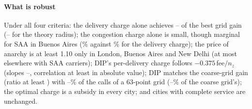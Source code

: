 \documentclass[preprint,12pt]{elsarticle}
\theoremstyle{definition}
\theoremstyle{remark}
\begin{document}
\begin{table}[tbp]\centering\small
\caption{Game results under four carrier criteria, three seeds, mean. PoA with the true expected routing cost and with the carriers' own (model) cost. DIP gain as \% of $|$social cost$|$ under each cost. Best uniform per-delivery charge on the coarse grid as a fraction of the fee. Weighted DIP charge: $u_z/$fee weighted by deliveries.}\label{tab:criterion}
\end{table}

\paragraph{What is robust} Under all four criteria: the delivery charge alone achieves \CritDelShareMin--\CritDelShareMax{} of the best grid gain (\CritDelShareMinTh--\CritDelShareMaxTh{} for the theory radius); the congestion charge alone is small, though marginal for SAA in Buenos Aires (\CritCongSaaBA\% against \CritDelSaaBA\% for the delivery charge); the price of anarchy is at least 1.10 only in London, Buenos Aires and New Delhi (at most \CritPoaAboveOther{} elsewhere with SAA carriers); DIP's per-delivery charge follows $-0.375\,$fee$/n_z$ (slopes \CritSlopeMin--\CritSlopeMax, correlation at least \CritCorrAbsMin{} in absolute value); DIP matches the coarse-grid gain (ratio at least \CritDipGridMin) with \CritDipCallsShareSixThreeMin--\CritDipCallsShareSixThreeMax\% of the calls of a 63-point grid (\CritDipCallsShareGridMin--\CritDipCallsShareGridMax\% of the coarse grid's); the optimal charge is a subsidy in every city; and cities with complete service are unchanged.
\end{document}
